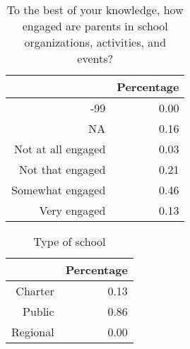 \documentclass[12pt]{article}
\begin{document}
\begin{table}[ht]
\caption {To the best of your knowledge, how engaged are parents in school organizations, activities, and events?}
\centering
\begin{tabular}{rr}
  \hline
 & Percentage \\ 
  \hline
-99 & 0.00 \\ 
  NA & 0.16 \\ 
  Not at all engaged & 0.03 \\ 
  Not that engaged & 0.21 \\ 
  Somewhat engaged & 0.46 \\ 
  Very engaged & 0.13 \\ 
   \hline
\end{tabular}
\end{table}

\begin{table}[ht]
\caption {Type of school}
\centering
\begin{tabular}{rr}
  \hline
 & Percentage \\ 
  \hline
Charter & 0.13 \\ 
  Public & 0.86 \\ 
  Regional & 0.00 \\ 
   \hline
\end{tabular}
\end{table}
\end{document}
